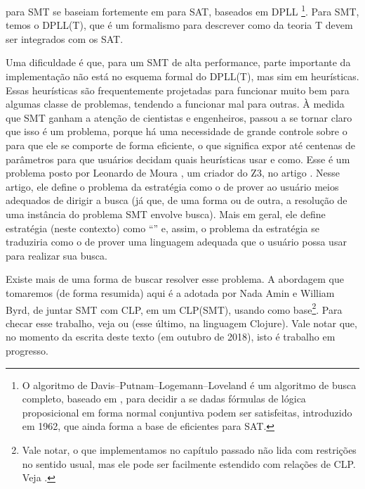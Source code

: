\documentclass{article}
\begin{document}
 para SMT se baseiam fortemente em 
para SAT, baseados em DPLL \footnote{O algoritmo de
  Davis–Putnam–Logemann–Loveland é um algoritmo de busca completo,
  baseado em , para decidir a se dadas fórmulas
  de lógica proposicional em forma normal conjuntiva podem ser
  satisfeitas, introduzido em 1962, que ainda forma a base de
   eficientes para SAT.}. Para SMT, temos o DPLL(T),
que é um formalismo para descrever como  da teoria
T devem ser integrados com os  SAT.

Uma dificuldade é que, para um  SMT de alta
performance, parte importante da implementação não está no esquema
formal do DPLL(T), mas sim em heurísticas. Essas heurísticas
são frequentemente projetadas para funcionar muito bem para algumas
classe de problemas, tendendo a funcionar mal para outras. À
medida que  SMT ganham a atenção de cientistas e
engenheiros, passou a se tornar claro que isso é um problema, porque há
uma necessidade de grande controle sobre o  para que
ele se comporte de forma eficiente, o que 
significa expor até centenas de parâmetros para que usuários
decidam quais heurísticas usar e como. Esse é um problema posto por
Leonardo de Moura , um criador do Z3, no artigo
\cite{moura}. Nesse artigo, ele define o problema da estratégia como o
de prover ao usuário meios adequados de dirigir a busca (já que, de
uma forma ou de outra, a resolução de uma instância do problema SMT
envolve busca). Mais em geral, ele define estratégia (neste contexto)
como ``''\cite{moura} e, assim, o problema da estratégia se
traduziria como o de prover uma linguagem adequada que o usuário possa
usar para realizar sua busca.

Existe mais de uma forma de buscar resolver esse problema. A abordagem
que tomaremos (de forma resumida) aqui é a adotada por Nada Amin e
William Byrd, de juntar SMT com CLP, em um CLP(SMT), usando 
como base\footnote{Vale notar, o que implementamos no capítulo passado
  não lida com restrições no sentido usual, mas ele pode ser
  facilmente estendido com relações de CLP. Veja \cite{alvis}.}. Para
checar esse trabalho, veja \cite{namin} ou
\cite{namim} (esse último, na linguagem Clojure). Vale notar que, no
momento da escrita deste texto (em outubro de 2018), isto é trabalho
em progresso.
\end{document}
